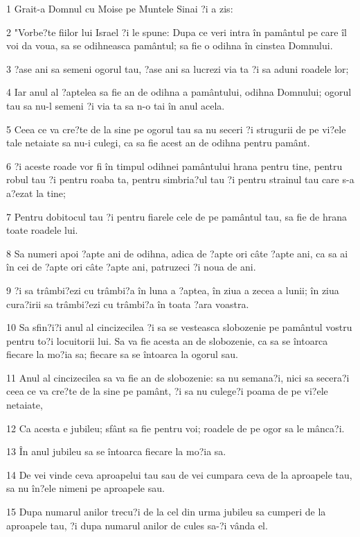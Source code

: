 \par 1 Grait-a Domnul cu Moise pe Muntele Sinai ?i a zis:
\par 2 "Vorbe?te fiilor lui Israel ?i le spune: Dupa ce veri intra în pamântul pe care îl voi da voua, sa se odihneasca pamântul; sa fie o odihna în cinstea Domnului.
\par 3 ?ase ani sa semeni ogorul tau, ?ase ani sa lucrezi via ta ?i sa aduni roadele lor;
\par 4 Iar anul al ?aptelea sa fie an de odihna a pamântului, odihna Domnului; ogorul tau sa nu-l semeni ?i via ta sa n-o tai în anul acela.
\par 5 Ceea ce va cre?te de la sine pe ogorul tau sa nu seceri ?i strugurii de pe vi?ele tale netaiate sa nu-i culegi, ca sa fie acest an de odihna pentru pamânt.
\par 6 ?i aceste roade vor fi în timpul odihnei pamântului hrana pentru tine, pentru robul tau ?i pentru roaba ta, pentru simbria?ul tau ?i pentru strainul tau care s-a a?ezat la tine;
\par 7 Pentru dobitocul tau ?i pentru fiarele cele de pe pamântul tau, sa fie de hrana toate roadele lui.
\par 8 Sa numeri apoi ?apte ani de odihna, adica de ?apte ori câte ?apte ani, ca sa ai în cei de ?apte ori câte ?apte ani, patruzeci ?i noua de ani.
\par 9 ?i sa trâmbi?ezi cu trâmbi?a în luna a ?aptea, în ziua a zecea a lunii; în ziua cura?irii sa trâmbi?ezi cu trâmbi?a în toata ?ara voastra.
\par 10 Sa sfin?i?i anul al cincizecilea ?i sa se vesteasca slobozenie pe pamântul vostru pentru to?i locuitorii lui. Sa va fie acesta an de slobozenie, ca sa se întoarca fiecare la mo?ia sa; fiecare sa se întoarca la ogorul sau.
\par 11 Anul al cincizecilea sa va fie an de slobozenie: sa nu semana?i, nici sa secera?i ceea ce va cre?te de la sine pe pamânt, ?i sa nu culege?i poama de pe vi?ele netaiate,
\par 12 Ca acesta e jubileu; sfânt sa fie pentru voi; roadele de pe ogor sa le mânca?i.
\par 13 În anul jubileu sa se întoarca fiecare la mo?ia sa.
\par 14 De vei vinde ceva aproapelui tau sau de vei cumpara ceva de la aproapele tau, sa nu în?ele nimeni pe aproapele sau.
\par 15 Dupa numarul anilor trecu?i de la cel din urma jubileu sa cumperi de la aproapele tau, ?i dupa numarul anilor de cules sa-?i vânda el.
